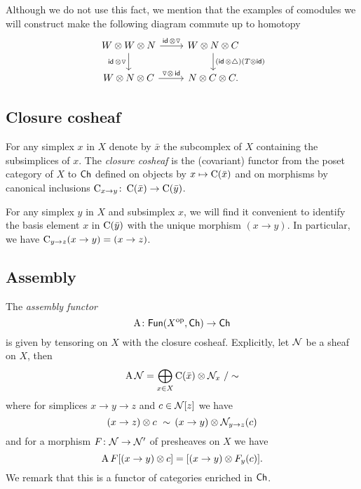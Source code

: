 Although we do not use this fact, we mention that the examples of comodules we will construct make the following diagram commute up to homotopy
\[
\begin{tikzcd}
	W \ot W \ot N \arrow[r, "\id\, \ot \triangledown"] \arrow[d, "\id\, \ot \triangledown"'] &
	W \ot N \ot C \arrow[d, "(\id\, \ot \triangle)(T \ot \id)"] \\
	W \ot N \ot C \arrow[r, "\triangledown \ot\, \id"] &
	N \ot C \ot C.
\end{tikzcd}
\]

\subsection{Closure cosheaf}

For any simplex $x$ in $X$ denote by $\bar x$ the subcomplex of $X$ containing the subsimplices of $x$.
The \textit{closure cosheaf} is the (covariant) functor from the poset category of $X$ to $\mathsf{Ch}$ defined on objects by $x \mapsto \operatorname{C}(\bar x)$ and on morphisms by canonical inclusions $\operatorname{C}_{x \to y} \colon \operatorname{C}(\bar x) \to \operatorname{C}(\bar y)$.

For any simplex $y$ in $X$ and subsimplex $x$, we will find it convenient to identify the basis element $x$ in $\operatorname{C}(\bar y)$ with the unique morphism $(x \to y)$.
In particular, we have $\operatorname{C}_{y \to z} (x \to y) = (x \to z)$.

\subsection{Assembly}\label{ss:assembly}

The \textit{assembly functor}
\[
\operatorname{A} \colon \mathsf{Fun}(X^{\mathrm{op}}, \mathsf{Ch}) \to \mathsf{Ch}
\]
is given by tensoring on $X$ with the closure cosheaf.
Explicitly, let $\mathcal{N}$ be a sheaf on $X$, then
\[
\operatorname{A} \mathcal{N} = \bigoplus_{x \in X} \operatorname{C}(\bar x) \otimes \mathcal{N}_x \ / \sim
\]
where for simplices $x \to y \to z$ and $c \in \mathcal{N}[z]$ we have
\[
(x \to z) \otimes c \ \sim \, (x \to y) \otimes \mathcal{N}_{y \to z}(c)
\]
and for a morphism $F \colon \mathcal{N} \to \mathcal{N}'$ of presheaves on $X$ we have
\[
\operatorname{A} F[(x \to y) \otimes c] = [(x \to y) \otimes F_y(c)].
\]
We remark that this is a functor of categories enriched in $\mathsf{Ch}$.


